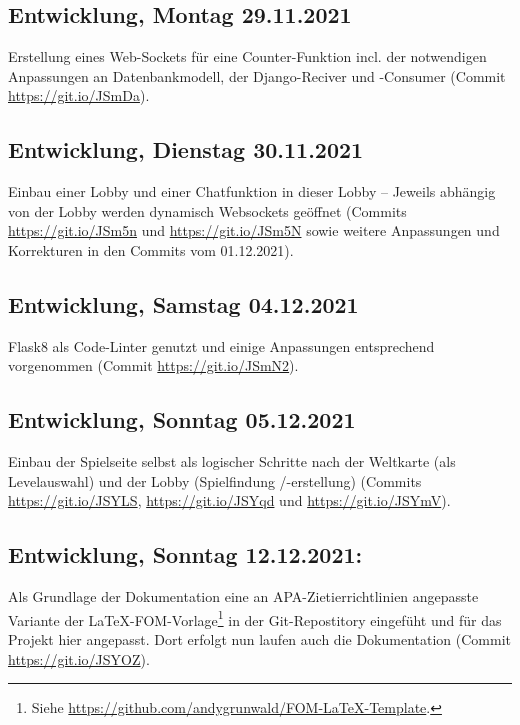 \subsection{Entwicklung, Montag 29.11.2021}

Erstellung eines Web-Sockets für eine Counter-Funktion incl. der notwendigen Anpassungen an Datenbankmodell, der Django-Reciver und -Consumer (Commit \url{https://git.io/JSmDa}).



\subsection{Entwicklung, Dienstag 30.11.2021}

Einbau einer Lobby und einer Chatfunktion in dieser Lobby -- Jeweils abhängig von der Lobby werden dynamisch Websockets geöffnet (Commits \url{https://git.io/JSm5n} und \url{https://git.io/JSm5N} sowie weitere Anpassungen und Korrekturen in den Commits vom 01.12.2021).


\subsection{Entwicklung, Samstag 04.12.2021}

Flask8 als Code-Linter genutzt und einige Anpassungen entsprechend vorgenommen (Commit \url{https://git.io/JSmN2}).


\subsection{Entwicklung, Sonntag 05.12.2021}

Einbau der Spielseite selbst als logischer Schritte nach der Weltkarte (als Levelauswahl) und der Lobby (Spielfindung /-erstellung) (Commits \url{https://git.io/JSYLS}, \url{https://git.io/JSYqd} und \url{https://git.io/JSYmV}).



\subsection{Entwicklung, Sonntag 12.12.2021:}

Als Grundlage der Dokumentation eine an APA-Zietierrichtlinien angepasste Variante der LaTeX-FOM-Vorlage\footnote{Siehe \url{https://github.com/andygrunwald/FOM-LaTeX-Template}.} in der Git-Repostitory eingefüht und für das Projekt hier angepasst. Dort erfolgt nun laufen auch die Dokumentation (Commit \url{https://git.io/JSYOZ}). 



